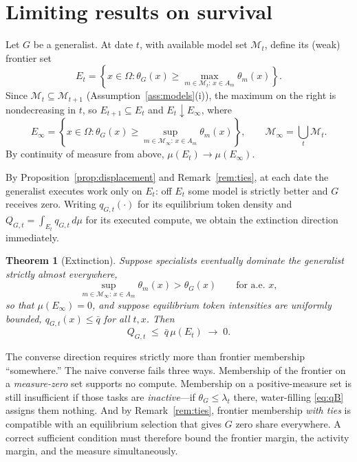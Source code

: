 \documentclass[11pt]{article}
\newtheorem{theorem}{Theorem}
\theoremstyle{definition}
\theoremstyle{remark}
\begin{document}
\section{Limiting results on survival}
\label{sec:limit}

Let $G$ be a generalist. At date $t$, with available model set $\mathcal{M}_t$, define its (weak) frontier set
\begin{equation}
E_t = \left\{ x \in \Omega : \theta_G(x) \ge \max_{m \in \mathcal{M}_t :\, x \in A_m} \theta_m(x) \right\}.
\end{equation}
Since $\mathcal{M}_t \subseteq \mathcal{M}_{t+1}$ (Assumption~\ref{ass:models}(i)), the maximum on the right is nondecreasing in $t$, so $E_{t+1} \subseteq E_t$ and $E_t \downarrow E_\infty$, where
\begin{equation}
E_\infty = \left\{ x \in \Omega : \theta_G(x) \ge \sup_{m \in \mathcal{M}_\infty :\, x \in A_m} \theta_m(x) \right\},
\qquad \mathcal{M}_\infty = \bigcup_t \mathcal{M}_t.
\end{equation}
By continuity of measure from above, $\mu(E_t) \to \mu(E_\infty)$.

By Proposition~\ref{prop:displacement} and Remark~\ref{rem:ties}, at each date the generalist executes work only on $E_t$: off $E_t$ some model is strictly better and $G$ receives zero. Writing $q_{G,t}(\cdot)$ for its equilibrium token density and $Q_{G,t} = \int_{E_t} q_{G,t}\, d\mu$ for its executed compute, we obtain the extinction direction immediately.

\begin{theorem}[Extinction]
\label{thm:extinction}
Suppose specialists eventually dominate the generalist strictly almost everywhere,
\begin{equation}
\sup_{m \in \mathcal{M}_\infty :\, x \in A_m} \theta_m(x) > \theta_G(x) \qquad \text{for a.e. } x,
\end{equation}
so that $\mu(E_\infty) = 0$, and suppose equilibrium token intensities are uniformly bounded, $q_{G,t}(x) \le \bar q$ for all $t, x$. Then
\begin{equation}
Q_{G,t} \;\le\; \bar q\, \mu(E_t) \;\longrightarrow\; 0.
\end{equation}
\end{theorem}

The converse direction requires strictly more than frontier membership ``somewhere.'' The naive converse fails three ways. Membership of the frontier on a \emph{measure-zero} set supports no compute. Membership on a positive-measure set is still insufficient if those tasks are \emph{inactive}---if $\theta_G \le \lambda_t$ there, water-filling \eqref{eq:qB} assigns them nothing. And by Remark~\ref{rem:ties}, frontier membership \emph{with ties} is compatible with an equilibrium selection that gives $G$ zero share everywhere. A correct sufficient condition must therefore bound the frontier margin, the activity margin, and the measure simultaneously.
\end{document}
